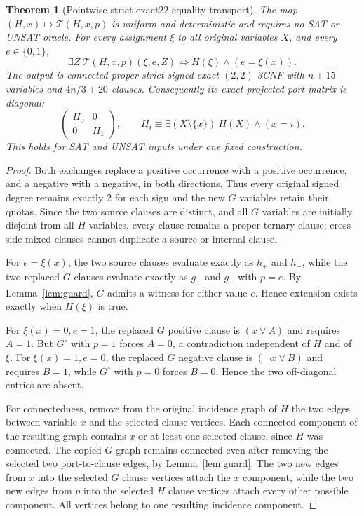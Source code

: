 \documentclass[11pt]{article}
\newtheorem{theorem}{Theorem}
\begin{document}
\begin{theorem}[Pointwise strict exact22 equality transport]\label{thm:transport}
The map $(H,x)\mapsto \mathcal T(H,x,p)$ is uniform and deterministic and requires no SAT or UNSAT oracle. For every assignment $\xi$ to \emph{all} original variables $X$, and every $e\in\{0,1\}$,
\[
\boxed{\exists Z\ \mathcal T(H,x,p)(\xi,e,Z)
 \iff H(\xi)\wedge (e=\xi(x)).}
\]
The output is connected proper strict signed exact-$(2,2)$ 3CNF with $n+15$ variables and $4n/3+20$ clauses. Consequently its exact projected port matrix is diagonal:
\[
\boxed{\quad
 \begin{pmatrix}H_0&0\\0&H_1\end{pmatrix},\qquad
 H_i\equiv\exists(X\setminus\{x\})\ H(X)\wedge(x=i).\quad}
\]
This holds for SAT and UNSAT inputs under one fixed construction.
\end{theorem}
\begin{proof}
Both exchanges replace a positive occurrence with a positive occurrence, and a negative with a negative, in both directions. Thus every original signed degree remains exactly $2$ for each sign and the new $G$ variables retain their quotas. Since the two source clauses are distinct, and all $G$ variables are initially disjoint from all $H$ variables, every clause remains a proper ternary clause; cross-side mixed clauses cannot duplicate a source or internal clause.

For $e=\xi(x)$, the two source clauses evaluate exactly as $h_+$ and $h_-$, while the two replaced $G$ clauses evaluate exactly as $g_+$ and $g_-$ with $p=e$. By Lemma~\ref{lem:guard}, $G$ admits a witness for either value $e$. Hence extension exists exactly when $H(\xi)$ is true.

For $\xi(x)=0,e=1$, the replaced $G$ positive clause is $(x\vee A)$ and requires $A=1$. But $G^\circ$ with $p=1$ forces $A=0$, a contradiction independent of $H$ and of $\xi$. For $\xi(x)=1,e=0$, the replaced $G$ negative clause is $(\neg x\vee B)$ and requires $B=1$, while $G^\circ$ with $p=0$ forces $B=0$. Hence the two off-diagonal entries are absent.

For connectedness, remove from the original incidence graph of $H$ the two edges between variable $x$ and the selected clause vertices. Each connected component of the resulting graph contains $x$ or at least one selected clause, since $H$ was connected. The copied $G$ graph remains connected even after removing the selected two port-to-clause edges, by Lemma~\ref{lem:guard}. The two new edges from $x$ into the selected $G$ clause vertices attach the $x$ component, while the two new edges from $p$ into the selected $H$ clause vertices attach every other possible component. All vertices belong to one resulting incidence component.
\end{proof}
\end{document}

